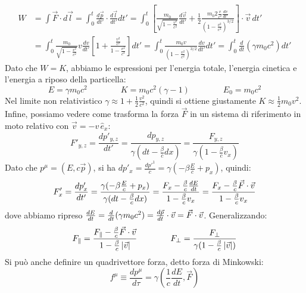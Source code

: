 \begin{equation}
	\begin{split}
		W &= \int \vec{F}\cdot d\vec{l} = \int_0^t \displaystyle\frac{d\vec{p}}{dt'}\cdot \displaystyle\frac{d\vec{l}}{dt'} dt' = \int_0^t \left[ \displaystyle\frac{m_0}{\sqrt{1 - \frac{v^2}{c^2}}} \displaystyle\frac{d\vec{v}}{dt'} + \frac{1}{2}\displaystyle\frac{m_0 2\frac{v}{c^2}\frac{dv}{dt'}}{\left(1 - \frac{v^2}{c^2}\right)^{3/2}} \right] \cdot\vec{v}\, dt' \\ 
		  &= \int_0^t \displaystyle\frac{m_0}{\sqrt{1-\frac{v^2}{c^2}}} v \displaystyle\frac{dv}{dt'} \left[ 1 + \displaystyle\frac{\frac{v^2}{c^2}}{1 - \frac{v^2}{c^2}}\right] dt' = \int_0^t \displaystyle\frac{m_0 v}{\left(1-\frac{v^2}{c^2}\right)^{3/2}} \displaystyle\frac{dv}{dt'} dt' = \int_0^t \displaystyle\frac{d}{dt}\left(\gamma m_0 c^2\right)dt'
	\end{split}
	\label{eq:21}
\end{equation}
Dato che $ W = K $, abbiamo le espressioni per l'energia totale, l'energia cinetica e l'energia a riposo della particella:
\begin{equation}
	E = \gamma m_0 c^2 \qquad\qquad K = m_0 c^2 (\gamma-1) \qquad\qquad E_0 = m_0 c^2
	\label{eq:22}
\end{equation}
Nel limite non relativistico $ \gamma \approx 1 + \frac{1}{2}\frac{v^2}{c^2} $, quindi si ottiene giustamente $ K \approx \frac{1}{2} m_0 v^2 $. \\ 
Infine, possiamo vedere come trasforma la forza $ \vec{F} $ in un sistema di riferimento in moto relativo con $ \vec{v} = -v\,\hat{e}_x $:
\begin{equation}
	F'_{y,z} = \displaystyle\frac{dp'_{y,z}}{dt'} = \displaystyle\frac{dp_{y,z}}{\gamma (dt - \frac{\beta}{c}dx)} = \displaystyle\frac{F_{y,z}}{\gamma (1 - \frac{\beta}{c} v_x)}
	\label{eq:23}
\end{equation}
Dato che $ p^{\mu} = (E, c\vec{p}) $, si ha $ dp'_x = \frac{dp'^1}{c} = \gamma (-\beta \frac{E}{c} + p_x) $, quindi:
\begin{equation}
	F'_x = \displaystyle\frac{dp'_x}{dt'} = \displaystyle\frac{\gamma (-\beta \frac{E}{c} + p_x)}{\gamma (dt - \frac{\beta}{c} dx)} = \displaystyle\frac{F_x - \frac{\beta}{c}\frac{dE}{dt}}{1 - \frac{\beta}{c}v_x} = \displaystyle\frac{F_x - \frac{\beta}{c}\vec{F}\cdot\vec{v}}{1 - \frac{\beta}{c} v_x}
	\label{eq:24}
\end{equation}
dove abbiamo ripreso $ \frac{dE}{dt} = \frac{d}{dt}(\gamma m_0 c^2) = \frac{d\vec{p}}{dt}\cdot\vec{v}=\vec{F}\cdot\vec{v} $. Generalizzando:
\begin{equation}
	F_{\parallel} = \displaystyle\frac{F_{\parallel} - \frac{\beta}{c}\vec{F}\cdot\vec{v}}{1 - \frac{\beta}{c} \left\lvert\vec{v}\right\rvert} \qquad\qquad F_{\perp} = \displaystyle\frac{F_{\perp}}{\gamma (1 - \frac{\beta}{c} \left\lvert\vec{v}\right\rvert)}
	\label{eq:25}
\end{equation}
Si può anche definire un quadrivettore forza, detto forza di Minkowski:
\begin{equation}
	f^{\mu} \equiv \displaystyle\frac{dp^{\mu}}{d\tau} = \gamma \left(\displaystyle\frac{1}{c}\displaystyle\frac{dE}{dt}, \vec{F}\right)
	\label{eq:26}
\end{equation}

